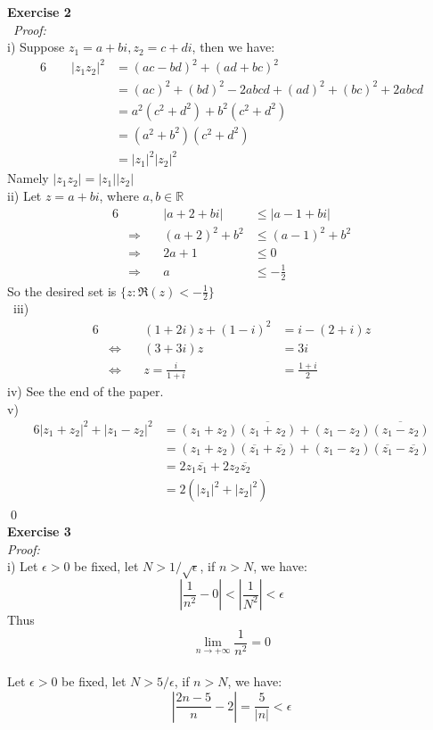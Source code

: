 \documentclass[12pt]{article}
\begin{document}
\textbf{Exercise 2}\\\
\textit{Proof: }\\i) Suppose $z_1=a+bi, z_2=c+di$, then we have:
\begin{alignat*}{6}
\quad\quad|z_1z_2|^2&=(ac-bd)^2+(ad+bc)^2\\
&={(ac)}^2+{(bd)}^2-2abcd+{(ad)}^2+{(bc)}^2+2abcd\\
&=a^2(c^2+d^2)+b^2(c^2+d^2)\\
&=(a^2+b^2)(c^2+d^2)\\
&={|z_1|}^2{|z_2|}^2
\end{alignat*}
Namely $|z_1z_2|=|z_1||z_2|$\\
ii) Let $z=a+bi$, where $a,b\in\mathbb{R}$
\begin{alignat*}{6}
&&|a+2+bi|&\leq|a-1+bi|\\
&\Longrightarrow \quad&{(a+2)}^2+b^2&\leq{(a-1)}^2+b^2\\
&\Longrightarrow &2a+1&\leq0\\
&\Longrightarrow & a&\leq-\frac{1}{2}
\end{alignat*}
So the desired set is $\{z:\Re(z)<-\frac{1}{2}\}$\\\
iii) \begin{alignat*}{6}
&   &(1+2i)z+(1-i)^2&=i-(2+i)z\\
&\iff\quad		  &(3+3i)z&=3i\\
&\iff     &z=\frac{i}{1+i}&=\frac{1+i}{2}
\end{alignat*}
iv) See the end of the paper.\\
v)
\begin{alignat*}{6}
{|z_1+z_2|}^2+{|z_1-z_2|}^2
&=(z_1+z_2)\overline{(z_1+z_2)}+(z_1-z_2)\overline{(z_1-z_2)}\\
&=(z_1+z_2)(\overline{z_1}+\overline{z_2})
+(z_1-z_2)(\overline{z_1}-\overline{z_2})\\
&=2z_1\overline{z_1}+2z_2\overline{z_2}\\
&=2\left({|z_1|}^2+{|z_2|}^2\right)
\end{alignat*}
\qed
\\
\textbf{Exercise 3}\\
\textit{Proof: }\\
i) Let $\epsilon>0$ be fixed,
let $N>1/\sqrt\epsilon$, if $n>N$, we have:
\[
\left|\frac{1}{n^2}-0\right|<\left|\frac{1}{N^2}\right|<\epsilon
\]
Thus 
\[
\lim_{n\to+\infty}\frac{1}{n^2}=0
\]\\
Let $\epsilon>0$ be fixed, let $N>5/\epsilon$, if $n>N$, we have:
\[
\left|\frac{2n-5}{n}-2\right|=\frac{5}{|n|}<\epsilon
\]
\end{document}
